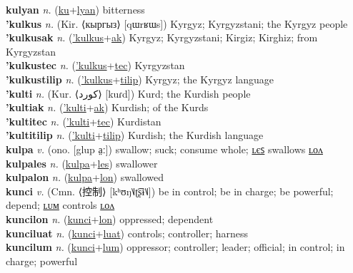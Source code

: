 \textbf{kulyan} \textit{n.} (\hyperref[ku]{ku}+\hyperref[lyan]{lyan})
bitterness \label{kulyan} \\
\textbf{'kulkus} \textit{n.} (Kir. ⟨кыргыз⟩ [qɯrʁɯs])
Kyrgyz; Kyrgyzstani; the Kyrgyz people \label{'kulkus} \\
\textbf{'kulkusak} \textit{n.} (\hyperref['kulkus]{'kulkus}+\hyperref[ak]{ak})
Kyrgyz; Kyrgyzstani; Kirgiz; Kirghiz; from Kyrgyzstan \label{'kulkusak} \\
\textbf{'kulkustec} \textit{n.} (\hyperref['kulkus]{'kulkus}+\hyperref[tec]{tec})
Kyrgyzstan \label{'kulkustec} \\
\textbf{'kulkustilip} \textit{n.} (\hyperref['kulkus]{'kulkus}+\hyperref[tilip]{tilip})
Kyrgyz; the Kyrgyz language \label{'kulkustilip} \\
\textbf{'kulti} \textit{n.} (Kur. ⟨کورد‎⟩ [kuɾd])
Kurd; the Kurdish people \label{'kulti} \\
\textbf{'kultiak} \textit{n.} (\hyperref['kulti]{'kulti}+\hyperref[ak]{ak})
Kurdish; of the Kurds \label{'kultiak} \\
\textbf{'kultitec} \textit{n.} (\hyperref['kulti]{'kulti}+\hyperref[tec]{tec})
Kurdistan \label{'kultitec} \\
\textbf{'kultitilip} \textit{n.} (\hyperref['kulti]{'kulti}+\hyperref[tilip]{tilip})
Kurdish; the Kurdish language \label{'kultitilip} \\
\textbf{kulpa} \textit{v.} (ono. [glup a̤ː])
swallow; suck; consume whole; \hyperref[kulpales]{ʟєꜱ} swallows \hyperref[kulpalon]{ʟᴏᴧ} \label{kulpa} \\
\textbf{kulpales} \textit{n.} (\hyperref[kulpa]{kulpa}+\hyperref[les]{les})
swallower \label{kulpales} \\
\textbf{kulpalon} \textit{n.} (\hyperref[kulpa]{kulpa}+\hyperref[lon]{lon})
swallowed \label{kulpalon} \\
\textbf{kunci} \textit{v.} (Cmn. ⟨控制⟩ [kʰʊŋ˥˩ʈ͡ʂɨ˥˩])
be in control; be in charge; be powerful; depend; \hyperref[kuncilum]{ʟᴜᴍ} controls \hyperref[kuncilon]{ʟᴏᴧ} \label{kunci} \\
\textbf{kuncilon} \textit{n.} (\hyperref[kunci]{kunci}+\hyperref[lon]{lon})
oppressed; dependent \label{kuncilon} \\
\textbf{kunciluat} \textit{n.} (\hyperref[kunci]{kunci}+\hyperref[luat]{luat})
controls; controller; harness \label{kunciluat} \\
\textbf{kuncilum} \textit{n.} (\hyperref[kunci]{kunci}+\hyperref[lum]{lum})
oppressor; controller; leader; official; in control; in charge; powerful \label{kuncilum} \\
